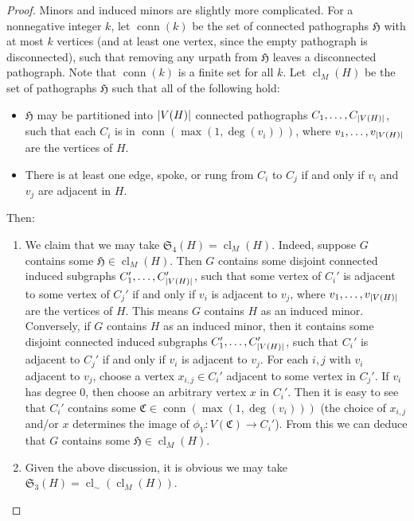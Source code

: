 \documentclass{article}
\newcommand{\Cf}{\mathfrak{C}}
\newcommand{\Hf}{\mathfrak{H}}
\newcommand{\Sf}{\mathfrak{S}}
\DeclarePairedDelimiter{\abs}{\lvert}{\rvert}
\DeclareMathOperator{\cl}{cl}
\DeclareMathOperator{\conn}{conn}
\begin{document}
\begin{proof}
Minors and induced minors are slightly more complicated. For a nonnegative integer $k$, let $\conn(k)$ be the set of connected pathographs $\Hf$ with at most $k$ vertices (and at least one vertex, since the empty pathograph is disconnected), such that removing any urpath from $\Hf$ leaves a disconnected pathograph. Note that $\conn(k)$ is a finite set for all $k$. Let $\cl_M(H)$ be the set of pathographs $\Hf$ such that all of the following hold:
\begin{itemize}
    \item $\Hf$ may be partitioned into $\abs{V(H)}$ connected pathographs $C_1,\dots,C_{\abs{V(H)}}$, such that each $C_i$ is in $\conn(\max(1,\deg(v_i)))$, where $v_1,\dots,v_{\abs{V(H)}}$ are the vertices of $H$.
    \item There is at least one edge, spoke, or rung from $C_i$ to $C_j$ if and only if $v_i$ and $v_j$ are adjacent in $H$.
\end{itemize}
Then:
\begin{enumerate}
    \item[4.] We claim that we may take $\Sf_4(H)=\cl_M(H)$. Indeed, suppose $G$ contains some $\Hf\in \cl_M(H)$. Then $G$ contains some disjoint connected induced subgraphs $C_1',\dots,C_{\abs{V(H)}}'$, such that some vertex of $C_i'$ is adjacent to some vertex of $C_j'$ if and only if $v_i$ is adjacent to $v_j$, where $v_1,\dots,v_{\abs{V(H)}}$ are the vertices of $H$. This means $G$ contains $H$ as an induced minor. Conversely, if $G$ contains $H$ as an induced minor, then it contains some disjoint connected induced subgraphs $C_1',\dots,C_{\abs{V(H)}}'$, such that $C_i'$ is adjacent to $C_j'$ if and only if $v_i$ is adjacent to $v_j$. For each $i,j$ with $v_i$ adjacent to $v_j$, choose a vertex $x_{i,j}\in C_i'$ adjacent to some vertex in $C_j'$. If $v_i$ has degree 0, then choose an arbitrary vertex $x$ in $C_i'$. Then it is easy to see that $C_i'$ contains some $\Cf\in \conn(\max(1,\deg(v_i)))$ (the choice of $x_{i,j}$ and/or $x$ determines the image of $\phi_V:V(\Cf)\to C_i'$). From this we can deduce that $G$ contains some $\Hf\in \cl_M(H)$.
    \item[3.] Given the above discussion, it is obvious we may take $\Sf_3(H)=\cl_\sim(\cl_M(H))$.
\end{enumerate}


\end{proof}
\end{document}
